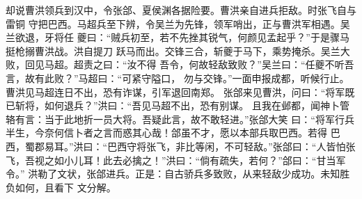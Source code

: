 却说曹洪领兵到汉中，令张郃、夏侯渊各据险要。曹洪亲自进兵拒敌。时张飞自与雷铜
守把巴西。马超兵至下辨，令吴兰为先锋，领军哨出，正与曹洪军相遇。吴兰欲退，牙将任
夔曰：“贼兵初至，若不先挫其锐气，何颜见孟起乎？”于是骤马挺枪搦曹洪战。洪自提刀
跃马而出。交锋三合，斩夔于马下，乘势掩杀。吴兰大败，回见马超。超责之曰：“汝不得
吾令，何故轻敌致败？”吴兰曰：“任夔不听吾言，故有此败？”马超曰：“可紧守隘口，
勿与交锋。”一面申报成都，听候行止。曹洪见马超连日不出，恐有诈谋，引军退回南郑。
张郃来见曹洪，问曰：“将军既已斩将，如何退兵？”洪曰：“吾见马超不出，恐有别谋。
且我在邺都，闻神卜管辂有言：当于此地折一员大将。吾疑此言，故不敢轻进。”张郃大笑
曰：“将军行兵半生，今奈何信卜者之言而惑其心哉！郃虽不才，愿以本部兵取巴西。若得
巴西，蜀郡易耳。”洪曰：“巴西守将张飞，非比等闲，不可轻敌。”张郃曰：“人皆怕张
飞，吾视之如小儿耳！此去必擒之！”洪曰：“倘有疏失，若何？”郃曰：“甘当军令。”
洪勒了文状，张郃进兵。正是：自古骄兵多致败，从来轻敌少成功。未知胜负如何，且看下
文分解。